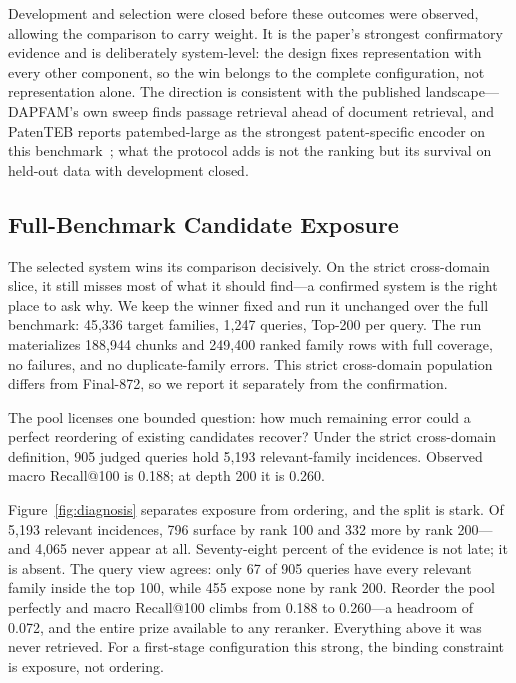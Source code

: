 \documentclass[a4paper,conference]{IEEEtran}
\begin{document}
Development and selection were closed before these outcomes were observed, allowing the comparison to carry weight. It is the paper's strongest confirmatory evidence and is deliberately system-level: the design fixes representation with every other component, so the win belongs to the complete configuration, not representation alone. The direction is consistent with the published landscape---DAPFAM's own sweep finds passage retrieval ahead of document retrieval, and PatenTEB reports patembed-large as the strongest patent-specific encoder on this benchmark~\cite{ayaou2026dapfam,ayaou2025patenteb}; what the protocol adds is not the ranking but its survival on held-out data with development closed.

\subsection{Full-Benchmark Candidate Exposure}

The selected system wins its comparison decisively. On the strict cross-domain slice, it still misses most of what it should find---a confirmed system is the right place to ask why. We keep the winner fixed and run it unchanged over the full benchmark: 45,336 target families, 1,247 queries, Top-200 per query. The run materializes 188,944 chunks and 249,400 ranked family rows with full coverage, no failures, and no duplicate-family errors. This strict cross-domain population differs from Final-872, so we report it separately from the confirmation.

The pool licenses one bounded question: how much remaining error could a perfect reordering of existing candidates recover? Under the strict cross-domain definition, 905 judged queries hold 5,193 relevant-family incidences. Observed macro Recall@100 is 0.188; at depth 200 it is 0.260.

Figure~\ref{fig:diagnosis} separates exposure from ordering, and the split is stark. Of 5,193 relevant incidences, 796 surface by rank 100 and 332 more by rank 200---and 4,065 never appear at all. Seventy-eight percent of the evidence is not late; it is absent. The query view agrees: only 67 of 905 queries have every relevant family inside the top 100, while 455 expose none by rank 200. Reorder the pool perfectly and macro Recall@100 climbs from 0.188 to 0.260---a headroom of 0.072, and the entire prize available to any reranker. Everything above it was never retrieved. For a first-stage configuration this strong, the binding constraint is exposure, not ordering.
\end{document}
